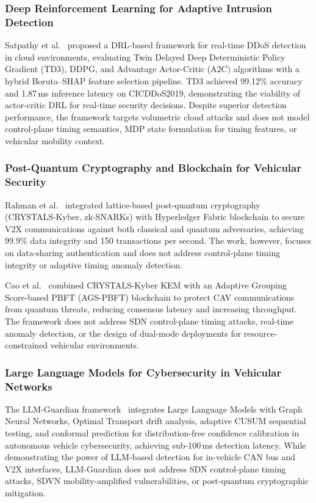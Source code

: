 \subsubsection{Deep Reinforcement Learning for Adaptive Intrusion Detection}
\label{sec:lit_drl_ids}
Satpathy et al.~\cite{satpathy2025cloud} proposed a DRL-based framework for
real-time DDoS detection in cloud environments, evaluating Twin Delayed Deep
Deterministic Policy Gradient (TD3), DDPG, and Advantage Actor-Critic (A2C)
algorithms with a hybrid Boruta--SHAP feature selection pipeline. TD3 achieved
99.12\% accuracy and 1.87\,ms inference latency on CICDDoS2019, demonstrating
the viability of actor-critic DRL for real-time security decisions. Despite
superior detection performance, the framework targets volumetric cloud attacks
and does not model control-plane timing semantics, MDP state formulation for
timing features, or vehicular mobility context.

\subsubsection{Post-Quantum Cryptography and Blockchain for Vehicular Security}
\label{sec:lit_pqc_v2x}
Rahman et al.~\cite{rahman2025quantum} integrated lattice-based post-quantum
cryptography (CRYSTALS-Kyber, zk-SNARKs) with Hyperledger Fabric blockchain
to secure V2X communications against both classical and quantum adversaries,
achieving 99.9\% data integrity and 150 transactions per second. The work,
however, focuses on data-sharing authentication and does not address
control-plane timing integrity or adaptive timing anomaly detection.

Cao et al.~\cite{cao2025quantum} combined CRYSTALS-Kyber KEM with an Adaptive
Grouping Score-based PBFT (AGS-PBFT) blockchain to protect CAV communications
from quantum threats, reducing consensus latency and increasing throughput.
The framework does not address SDN control-plane timing attacks, real-time
anomaly detection, or the design of dual-mode deployments for resource-
constrained vehicular environments.

\subsubsection{Large Language Models for Cybersecurity in Vehicular Networks}
\label{sec:lit_llm_cyber}
The LLM-Guardian framework~\cite{llmguardian2026} integrates Large Language
Models with Graph Neural Networks, Optimal Transport drift analysis, adaptive
CUSUM sequential testing, and conformal prediction for distribution-free
confidence calibration in autonomous vehicle cybersecurity, achieving sub-100\,ms
detection latency. While demonstrating the power of LLM-based detection for
in-vehicle CAN bus and V2X interfaces, LLM-Guardian does not address SDN
control-plane timing attacks, SDVN mobility-amplified vulnerabilities, or
post-quantum cryptographic mitigation.



